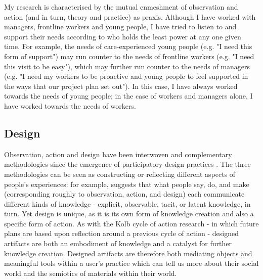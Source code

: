 My research is characterised by the mutual enmeshment of observation and action (and in turn, theory and practice) as praxis. Although I have worked with managers, frontline workers and young people, I have tried to listen to and support their needs according to who holds the least power at any one given time. For example, the needs of care-experienced young people (e.g. "I need this form of support") may run counter to the needs of frontline workers (e.g. "I need this visit to be easy"), which may further run counter to the needs of managers (e.g. "I need my workers to be proactive and young people to feel supported in the ways that our project plan set out"). In this case, I have always worked towards the needs of young people; in the case of workers and managers alone, I have worked towards the needs of workers. 

\subsection{Design}
\label{3-design}
Observation, action and design have been interwoven and complementary methodologies since the emergence of participatory design practices \citep{kyng_setting_1991}. The three methodologies can be seen as constructing or reflecting different aspects of people's experiences: for example, \citet{frascara_user-centered_2002} suggests that what people say, do, and make (corresponding roughly to observation, action, and design) each communicate different kinds of knowledge - explicit, observable, tacit, or latent knowledge, in turn. Yet design is unique, as it is its own form of knowledge creation and also a specific form of action. As with the Kolb cycle of action research - in which future plans are based upon reflection around a previous cycle of action - designed artifacts are both an embodiment of knowledge and a catalyst for further knowledge creation. Designed artifacts are therefore both mediating objects and meaningful tools within a user's practice \citep{kyng_setting_1991} which can tell us more about their social world and the semiotics of materials within their world. 

